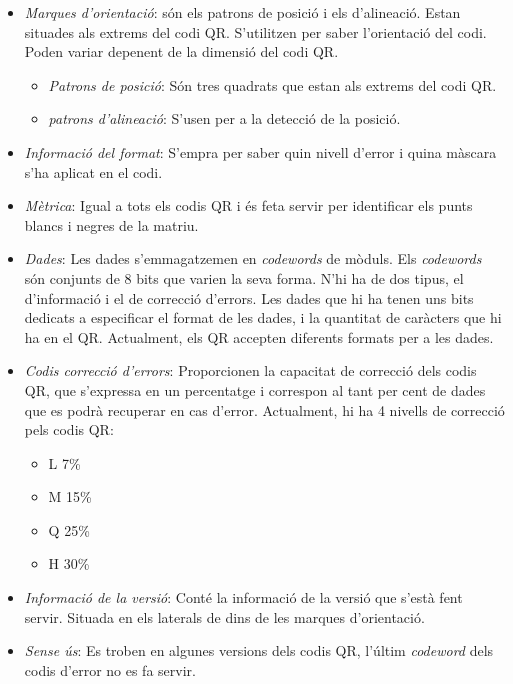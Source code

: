\begin{itemize}
  \item \emph{Marques d'orientació}: són els patrons de posició i els d'alineació.
  Estan situades als extrems del codi QR. S'utilitzen per saber l'orientació del codi.
  Poden variar depenent de la dimensió del codi QR.
  \begin{itemize}
    \item \emph{Patrons de posició}: Són tres quadrats que estan als extrems del codi QR.
    \item \emph{patrons d'alineació}: S'usen per a la detecció de la posició.
  \end{itemize}
  \item \emph{Informació del format}: S'empra per saber quin nivell d'error i quina màscara s'ha aplicat en el codi.
  \item \emph{Mètrica}: Igual a tots els codis QR i és feta servir per identificar els punts blancs i negres de la matriu.
  \item \emph{Dades}: Les dades s'emmagatzemen en \emph{codewords} de mòduls. Els \emph{codewords} són conjunts de 8 bits que varien la seva forma.
  N'hi ha de dos tipus, el d'informació i el de correcció d'errors. Les dades que hi ha tenen uns bits dedicats a especificar
  el format de les dades, i la quantitat de caràcters que hi ha en el QR. Actualment, els QR accepten diferents formats per a les dades.
  \item \emph{Codis correcció d'errors}: Proporcionen la capacitat de correcció dels codis QR, que s'expressa en un percentatge i correspon
  al tant per cent de dades que es podrà recuperar en cas d'error. Actualment, hi ha 4 nivells de correcció pels codis QR:
  \begin{itemize}
  \item L 7\%
  \item M 15\%
  \item Q 25\%
  \item H 30\%
  \end{itemize}
  \item \emph{Informació de la versió}: Conté la informació de la versió que s'està fent servir. Situada en els laterals
  de dins de les marques d'orientació.
  \item \emph{Sense ús}: Es troben en algunes versions dels codis QR, l'últim \emph{codeword} dels codis d'error no es fa servir.
\end{itemize}


